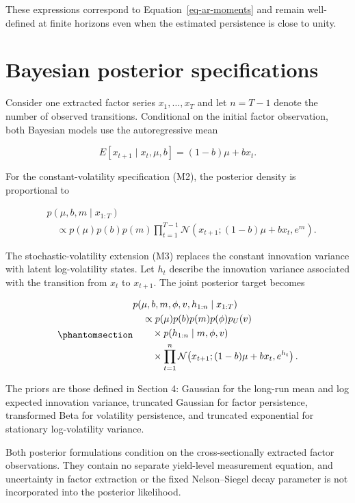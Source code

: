 \documentclass[
  12pt,
  letterpaper,
  DIV=11,
  numbers=noendperiod]{scrreprt}
\begin{document}
These expressions correspond to Equation~\ref{eq-ar-moments} and remain
well-defined at finite horizons even when the estimated persistence is
close to unity.

\section{Bayesian posterior
specifications}\label{bayesian-posterior-specifications}

Consider one extracted factor series \(x_1,\ldots,x_T\) and let
\(n=T-1\) denote the number of observed transitions. Conditional on the
initial factor observation, both Bayesian models use the autoregressive
mean

\[
E[x_{t+1}\mid x_t,\mu,b]
=(1-b)\mu+bx_t.
\]

For the constant-volatility specification (M2), the posterior density is
proportional to

\[
\begin{aligned}
&p(\mu,b,m\mid x_{1:T})\\
&\quad\propto
p(\mu)p(b)p(m)
\prod_{t=1}^{T-1}
\mathcal N\!\left(
x_{t+1};
(1-b)\mu+bx_t,
e^m
\right).
\end{aligned}
\]

The stochastic-volatility extension (M3) replaces the constant
innovation variance with latent log-volatility states. Let \(h_t\)
describe the innovation variance associated with the transition from
\(x_t\) to \(x_{t+1}\). The joint posterior target becomes

\begin{equation}\protect\phantomsection\label{eq-bayesian-targets}{
\begin{aligned}
&p(\mu,b,m,\phi,v,h_{1:n}\mid x_{1:T})\\
&\quad\propto
p(\mu)p(b)p(m)p(\phi)p_U(v)\\
&\qquad\times p(h_{1:n}\mid m,\phi,v)\\
&\qquad\times
\prod_{t=1}^{n}
\mathcal N\!\left(
x_{t+1};
(1-b)\mu+bx_t,
e^{h_t}
\right).
\end{aligned}
}\end{equation}

The priors are those defined in Section 4: Gaussian for the long-run
mean and log expected innovation variance, truncated Gaussian for factor
persistence, transformed Beta for volatility persistence, and truncated
exponential for stationary log-volatility variance.

Both posterior formulations condition on the cross-sectionally extracted
factor observations. They contain no separate yield-level measurement
equation, and uncertainty in factor extraction or the fixed
Nelson--Siegel decay parameter is not incorporated into the posterior
likelihood.
\end{document}
